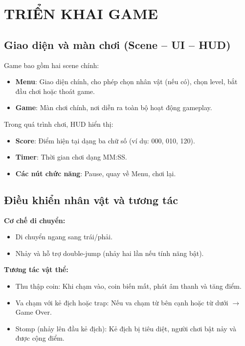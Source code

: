 \documentclass[a4paper,12pt]{article}
\begin{document}
\newpage

\section{TRIỂN KHAI GAME}

\subsection{Giao diện và màn chơi (Scene -- UI -- HUD)}

Game bao gồm hai scene chính:
\begin{itemize}
    \item \textbf{Menu}: Giao diện chính, cho phép chọn nhân vật (nếu có), chọn level, bắt đầu chơi hoặc thoát game.
    
    \item \textbf{Game}: Màn chơi chính, nơi diễn ra toàn bộ hoạt động gameplay.
\end{itemize}

Trong quá trình chơi, HUD hiển thị:
\begin{itemize}
    \item \textbf{Score}: Điểm hiện tại dạng ba chữ số (ví dụ: 000, 010, 120).
    \item \textbf{Timer}: Thời gian chơi dạng MM:SS.
    \item \textbf{Các nút chức năng}: Pause, quay về Menu, chơi lại.
\end{itemize}

\subsection{Điều khiển nhân vật và tương tác}

\textbf{Cơ chế di chuyển:}
\begin{itemize}
    \item Di chuyển ngang sang trái/phải.
    \item Nhảy và hỗ trợ double-jump (nhảy hai lần nếu tính năng bật).
\end{itemize}

\textbf{Tương tác vật thể:}
\begin{itemize}
    \item Thu thập coin: Khi chạm vào, coin biến mất, phát âm thanh và tăng điểm.
    \item Va chạm với kẻ địch hoặc trap: Nếu va chạm từ bên cạnh hoặc từ dưới $\rightarrow$ Game Over.
    \item Stomp (nhảy lên đầu kẻ địch): Kẻ địch bị tiêu diệt, người chơi bật nảy và được cộng điểm.
\end{itemize}
\end{document}
